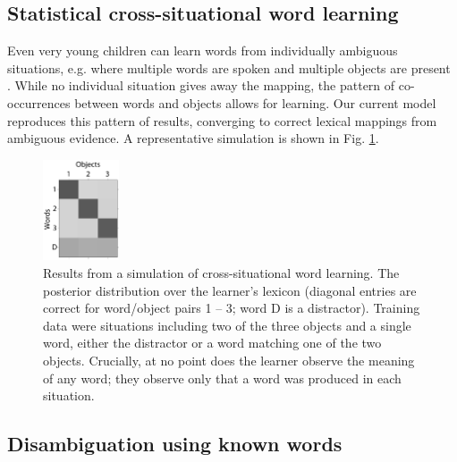 \documentclass{article} %
\begin{document}
\subsection{Statistical cross-situational word learning}

Even very young children can learn words from individually ambiguous situations, e.g. where multiple words are spoken and multiple objects are present \cite{smith2008}. While no individual situation gives away the mapping, the pattern of co-occurrences between words and objects allows for learning. Our current model reproduces this pattern of results, converging to correct lexical mappings from ambiguous evidence. A representative simulation is shown in Fig. \ref{fig:cross-sit}.

\begin{figure}
  \includegraphics[width=0.2\textwidth]{figures/cross-sit-mod.pdf}
  \caption{Results from a simulation of cross-situational word learning. The posterior distribution over the learner's lexicon (diagonal entries are correct for word/object pairs 1 -- 3; word D is a distractor). Training data were situations including two of the three objects and a single word, either the distractor or a word matching one of the two objects. Crucially, at no point does the learner observe the meaning of any word; they observe only that a word was produced in each situation.}
  \label{fig:cross-sit}
\end{figure}

\subsection{Disambiguation using known words}
\end{document}
